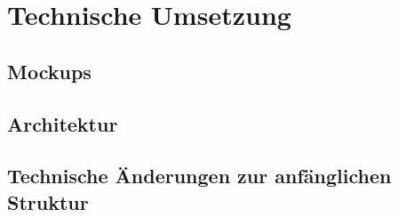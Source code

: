 
\chapter{Technische Umsetzung}

\section{Mockups}

\section{Architektur}

\section{Technische Änderungen zur anfänglichen Struktur}